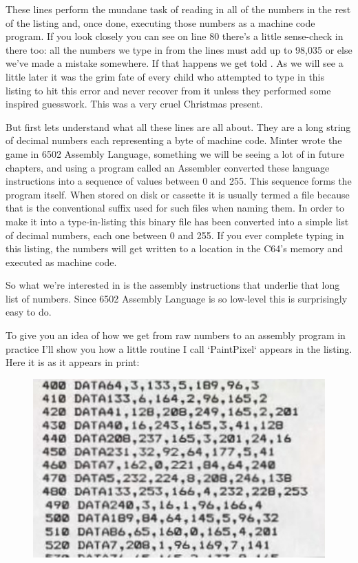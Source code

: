 These lines perform the mundane task of reading in all of the numbers in the
rest of the listing and, once done, executing those numbers as a machine code
program. If you look closely you can see on line 80 there's a little sense-check in there too: all the numbers
we type in from the  lines must add up to 98,035 or else we've made a mistake somewhere. If that happens
we get told . As we will see a little later it was the grim fate of every child who
attempted to type in this listing to hit this error and never recover from it unless they performed some
inspired guesswork. This was a very cruel Christmas present.

But first lets understand what all these  lines are all about. They are a long string of decimal
numbers each representing a byte of machine code. Minter wrote the game in 6502 Assembly Language, something
we will be seeing a lot of in future chapters, and using a program called an Assembler converted these
language instructions into a sequence of values between 0 and 255. This sequence forms the program itself.
When stored on disk or cassette it is usually termed a  file because that is the conventional
suffix used for such files when naming them. In order to make it into a type-in-listing this binary file
has been converted into a simple list of decimal numbers, each one between 0 and 255. If you ever complete
typing in this listing, the numbers will get written to a location in the C64's memory and executed as 
machine code.

So what we're interested in is the assembly instructions that underlie that long list of numbers. Since 
6502 Assembly Language is so low-level this is surprisingly easy to do.


To give you an idea of how we get from raw numbers to an assembly program in practice I'll show you how
a little routine I call `PaintPixel` appears in the listing. Here it is as it appears in print:

\begin{figure}[H]
    \centering
    \begin{adjustbox}{width=7cm,center}
      \includegraphics[width=12cm]{src/listing/PaintPixel.jpg}%
    \end{adjustbox}
\end{figure}

